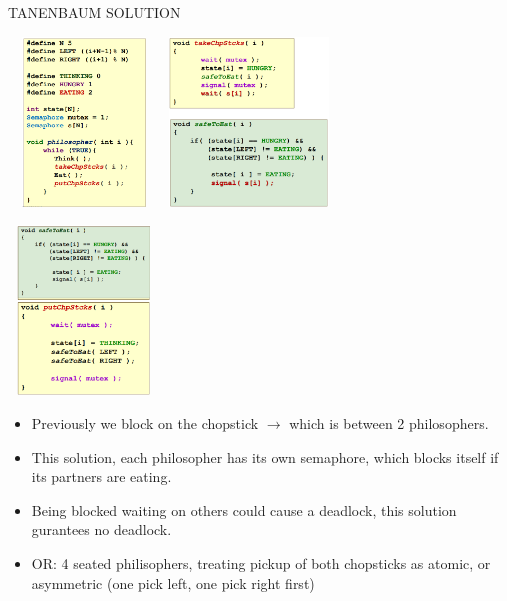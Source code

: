\documentclass[10pt,landscape]{article}
\begin{document}
\begin{multicols*}{3}
TANENBAUM SOLUTION 
\begin{multicols*}{2}
    \includegraphics*[width=4cm, height=4.5cm]{images/tanenbaum1.png}
    \includegraphics*[width=4.5cm, height=4.5cm]{images/tanenbaum2.png}
\end{multicols*}
\begin{multicols*}{2}
    \includegraphics*[width=4cm, height=4.5cm]{images/tanenbaum3.png} 
    \begin{itemize}[topsep=0pt,noitemsep,wide=0pt, leftmargin=\dimexpr{} + 2\relax, topsep=0pt]
        \item Previously we block on the chopstick $\rightarrow$ which is between 2 philosophers.
        \item This solution, each philosopher has its own semaphore, which blocks itself if its partners are eating.
        \item Being blocked waiting on others could cause a deadlock, this solution gurantees no deadlock.
        \item OR: 4 seated philisophers, treating pickup of both chopsticks as atomic, or asymmetric (one pick left, one pick right first)
    \end{itemize}
\end{multicols*}


\end{multicols*}
\end{document}
